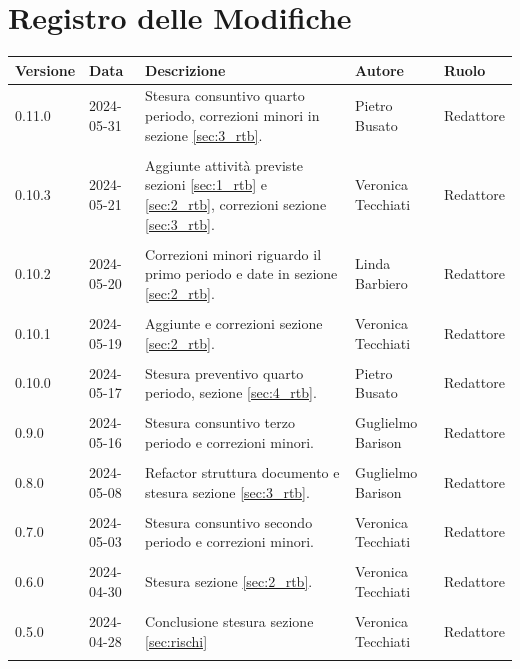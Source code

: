 \documentclass[8pt]{article}
\begin{document}
\section*{Registro delle Modifiche}
\begin{table}[ht!]	
\hypersetup{hidelinks}
	\centering
	\begin{tabular}{p{1.2cm} p{2cm} p{6cm} p{3cm} p{2cm}}
		\toprule
		\textbf{Versione}& \textbf{Data} & \textbf{Descrizione} & \textbf{Autore} & \textbf{Ruolo} \\
		\midrule 
		0.11.0 & 2024-05-31 & Stesura consuntivo quarto periodo, correzioni minori in sezione \ref{sec:3_rtb}. & Pietro Busato & Redattore \\\\
        0.10.3 & 2024-05-21 & Aggiunte attività previste sezioni \ref{sec:1_rtb} e \ref{sec:2_rtb}, correzioni sezione \ref{sec:3_rtb}. & Veronica Tecchiati & Redattore \\\\
        0.10.2 & 2024-05-20 & Correzioni minori riguardo il primo periodo e date in sezione \ref{sec:2_rtb}. & Linda Barbiero & Redattore \\\\
		0.10.1 & 2024-05-19 & Aggiunte e correzioni sezione \ref{sec:2_rtb}. & Veronica Tecchiati & Redattore \\\\
        0.10.0 & 2024-05-17 & Stesura preventivo quarto periodo, sezione \ref{sec:4_rtb}. & Pietro Busato & Redattore \\\\
		0.9.0 & 2024-05-16 & Stesura consuntivo terzo periodo e correzioni minori. & Guglielmo Barison & Redattore \\\\
        0.8.0 & 2024-05-08 & Refactor struttura documento e stesura sezione \ref{sec:3_rtb}. & Guglielmo Barison & Redattore \\\\
        0.7.0 & 2024-05-03 & Stesura consuntivo secondo periodo e correzioni minori. & Veronica Tecchiati & Redattore \\\\
        0.6.0 & 2024-04-30 & Stesura sezione \ref{sec:2_rtb}. & Veronica Tecchiati & Redattore \\\\
        0.5.0 & 2024-04-28 & Conclusione stesura sezione \ref{sec:rischi} & Veronica Tecchiati & Redattore \\\\

\end{tabular}
\end{table}
\end{document}
